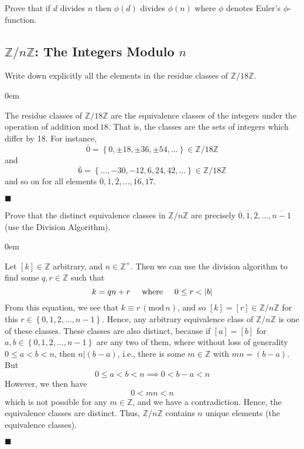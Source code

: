 \documentclass[12pt]{article}
\renewcommand{\qed}{\hfill$\blacksquare$}
\renewenvironment{proof}{\begin{addmargin}[1em]{0em}\begin{newproof}}{\end{newproof}\end{addmargin}\qed}
\newenvironment{problem}[2][Exercise]{\begin{trivlist}
\item[\hskip \labelsep {\bfseries #1}\hskip \labelsep {\bfseries #2.}]}{\end{trivlist}}
\begin{document}
\begin{problem}{0.2.11}
Prove that if $d$ divides $n$ then $\phi\left(d\right)$ divides $\phi\left(n\right)$ where $\phi$ denotes Euler's $\phi$-function.
\end{problem}






\subsection*{$\mathbb{Z}/n\mathbb{Z}$: The Integers Modulo $n$}

\begin{problem}{0.3.1}
Write down explicitly all the elements in the residue classes of $\mathbb{Z}/18\mathbb{Z}$.
\end{problem}

\begin{proof}
The residue classes of $\mathbb{Z}/18\mathbb{Z}$ are the equivalence classes of the integers under the operation of addition $\text{mod}\, 18$. That is, the classes are the sets of integers which differ by 18. For instance,
$$ \overline{0} = \left\{ 0,\pm 18, \pm 36, \pm 54,\ldots \right\} \in \mathbb{Z}/18\mathbb{Z} $$
and
$$ \overline{6} = \left\{ \ldots,-30,-12, 6, 24, 42, \ldots \right\} \in \mathbb{Z}/18\mathbb{Z} $$
and so on for all elements $\overline{0},\overline{1},\overline{2},\ldots,\overline{16},\overline{17}$.
\end{proof}





\begin{problem}{0.3.2}
Prove that the distinct equivalence classes in $\mathbb{Z}/n\mathbb{Z}$ are precisely $\overline{0}, \overline{1},\overline{2},\ldots,\overline{n-1}$ (use the Division Algorithm).
\end{problem}
\begin{proof}
Let $\left[k\right]\in \mathbb{Z}$ arbitrary, and $n\in \mathbb{Z}^+$. Then we can use the division algorithm to find some $q,r \in \mathbb{Z}$ such that
$$ k = qn + r \hspace{5mm} \text{where} \hspace{5mm} 0 \leq r < \left|b\right| $$
From this equation, we see that $k \equiv r \, \left(\text{mod} \, n\right)$, and so $\left[k\right] =  \left[r\right] \in \mathbb{Z}/n\mathbb{Z}$ for this $r \in \left\{ 0,1,2,\ldots,n-1\right\}$. Hence, any arbitrary equivalence class of $\mathbb{Z}/n\mathbb{Z}$ is one of these classes. These classes are also distinct, because if $\left[a\right]= \left[b\right]$ for $a,b \in \left\{0,1,2,\ldots,n-1\right\}$ are any two of them, where without loss of generality $0\leq a <b < n$, then $n|\left(b-a\right)$, i.e., there is some $m\in \mathbb{Z}$ with $mn = \left(b-a\right)$. But $$ 0 \leq a < b < n \implies 0 < b-a < n$$
However, we then have
$$ 0 < mn < n $$
which is not possible for any $m\in \mathbb{Z}$, and we have a contradiction. Hence, the equivalence classes are distinct. Thus, $\mathbb{Z}/n\mathbb{Z}$ contains $n$ unique elements (the equivalence classes).
\end{proof}
\end{document}
